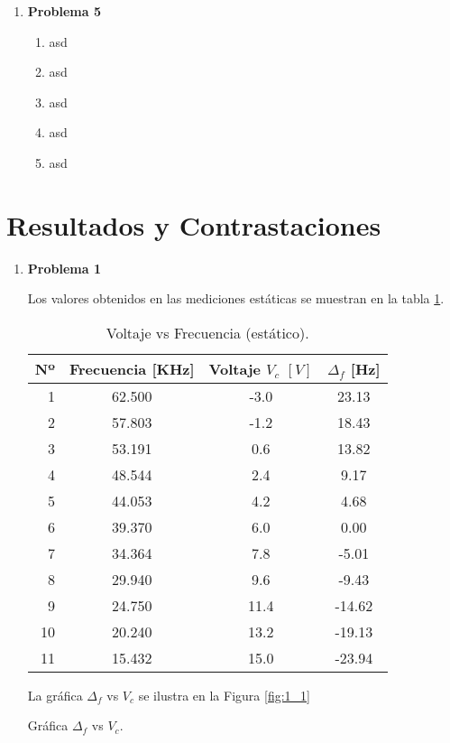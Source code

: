 \documentclass[letterpaper, titlepage]{article}
\begin{document}
\begin{enumerate}
		\item \textbf{Problema 5}
		\begin{enumerate}
			\item asd
			\item asd
			\item asd
			\item asd
			\item asd
		\end{enumerate}
	\end{enumerate}
\newpage
\newpage

\section{Resultados y Contrastaciones}
	\begin{enumerate}
		\item \textbf{Problema 1}
		
		{Los valores obtenidos en las mediciones estáticas se muestran en la tabla \ref{tab:tabla1}.
		
		\begin{table}[ht]
			\centering
			\begin{tabular}{r|c c c}
				Nº & Frecuencia [KHz] & Voltaje $V_c$ $[V]$ & $\Delta_f$ [Hz] \\
				\hline \rule{0ex}{4ex}
				1 	& 62.500 & -3.0	&  23.13 \\
				2 	& 57.803 & -1.2	&  18.43 \\
				3 	& 53.191 &  0.6	&  13.82 \\
				4 	& 48.544 &  2.4	&   9.17 \\
				5 	& 44.053 &  4.2	&   4.68 \\
				6 	& 39.370 &  6.0	&   0.00 \\
				7 	& 34.364 &  7.8	&  -5.01 \\
				8 	& 29.940 &  9.6	&  -9.43 \\
				9 	& 24.750 & 11.4 & -14.62 \\
				10 	& 20.240 & 13.2	& -19.13 \\
				11 	& 15.432 & 15.0	& -23.94
			\end{tabular}
			\caption{Voltaje vs Frecuencia (estático).}
			\label{tab:tabla1}
		\end{table}
		
		La gráfica $\Delta_f$ vs $V_c$ se ilustra en la Figura \ref{fig:1_1}
		
			{Gráfica $\Delta_f$ vs $V_c$.}
			
}
\end{enumerate}
\end{document}
